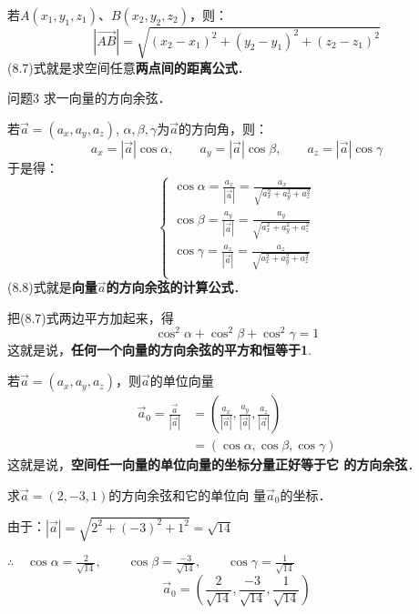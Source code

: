 若$A(x_1,y_1,z_1)$、$B(x_2,y_2,z_2)$，则：
\begin{equation}
   |\Vec{AB}|=\sqrt{(x_2-x_1)^2+(y_2-y_1)^2+(z_2-z_1)^2} 
\end{equation}
(8.7)式就是求空间任意\textbf{两点间的距离公式}．


\begin{blk}
    {问题3} 求一向量的方向余弦．
\end{blk}

若$\vec{a}=(a_x,a_y,a_z)$, $\alpha,\beta,\gamma$为$\vec{a}$的方向角，则：
\[a_x=|\vec{a}|\cos\alpha,\qquad a_y=|\vec{a}|\cos\beta,\qquad a_z=|\vec{a}|\cos\gamma\]
于是得：
\begin{equation}
    \begin{cases}
    \cos\alpha=\frac{a_x}{|\vec{a}|}=\frac{a_x}{\sqrt{a^2_x+a^2_y+a^2_z}}\\
    \cos\beta=\frac{a_y}{|\vec{a}|}=\frac{a_y}{\sqrt{a^2_x+a^2_y+a^2_z}}\\
    \cos\gamma=\frac{a_z}{|\vec{a}|}=\frac{a_z}{\sqrt{a^2_x+a^2_y+a^2_z}}\\        
    \end{cases}
\end{equation}
(8.8)式就是\textbf{向量$\vec{a}$的方向余弦的计算公式}．

把(8.7)式两边平方加起来，得
\[\cos^2\alpha+\cos^2\beta+\cos^2\gamma=1\]
这就是说，\textbf{任何一个向量的方向余弦的平方和恒等于1}.

若$\vec{a}=(a_x,a_y,a_z)$，则$\vec{a}$的单位向量
\[\begin{split}
    \vec{a}_0=\frac{\vec{a}}{|\vec{a}|}&=\left(\frac{a_x}{|\vec{a}|},\frac{a_y}{|\vec{a}|},\frac{a_z}{|\vec{a}|}\right)\\
    &=(\cos\alpha,\cos\beta,\cos\gamma)
\end{split}\]
这就是说，\textbf{空间任一向量的单位向量的坐标分量正好等于它
的方向余弦}．

\begin{example}
    求$\vec{a}=(2,-3,1)$的方向余弦和它的单位向
量$\vec{a}_0$的坐标．
\end{example}

\begin{solution}
由于：$|\vec{a}|=\sqrt{2^2+(-3)^2+1^2}=\sqrt{14}$

$\therefore\quad \cos\alpha=\frac{2}{\sqrt{14}},\qquad \cos\beta=\frac{-3}{\sqrt{14}},\qquad \cos\gamma=\frac{1}{\sqrt{14}}$
\[\vec{a}_0=\left(\frac{2}{\sqrt{14}},\frac{-3}{\sqrt{14}},\frac{1}{\sqrt{14}}\right)\]
\end{solution}

